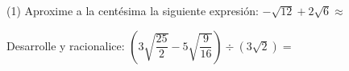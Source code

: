 \documentclass[]{srs}
\begin{document}
\begin{preguntas}(1)
  \pregunta Aproxime a la centésima la siguiente expresión: $-\sqrt{12}+2\sqrt{6}\approx$
  \begin{malla}[height=6cm]
  \end{malla}
  \pregunta Desarrolle y racionalice:
  $\left(3\sqrt{\dfrac{25}{2}}-5\sqrt{\dfrac{9}{16}}\right)\div\left(3\sqrt{2}\right)=$
  \begin{malla}[height=15cm]
  \end{malla}
\end{preguntas}
\end{document}
